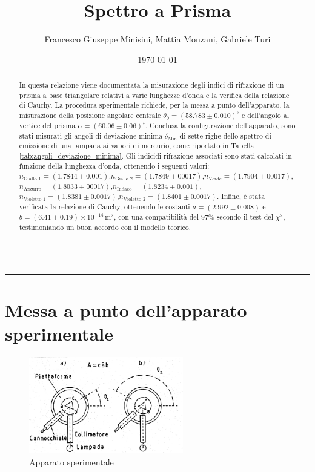 \documentclass[a4paper,12pt]{article}
\title{Spettro a Prisma}
\author{Francesco Giuseppe Minisini, Mattia Monzani, Gabriele Turi}
\date{\today}
\begin{document}
\maketitle
\hrule
\vspace{9pt}
\begin{abstract}
\noindent
In questa relazione viene documentata la misurazione degli indici di rifrazione di un prisma a base triangolare relativi a varie lunghezze d'onda e la verifica della relazione di Cauchy. La procedura sperimentale richiede, per la messa a punto dell'apparato, la misurazione della posizione angolare centrale \(\theta_0 = (58.783 \pm 0.010)^\circ\) e dell'angolo al vertice del prisma \(\alpha = (60.06 \pm 0.06)^\circ\). Conclusa la configurazione dell'apparato, sono stati misurati gli angoli di deviazione minima \(\delta_{\text{Min}}\) di sette righe dello spettro di emissione di una lampada ai vapori di mercurio, come riportato in Tabella \ref{tab:angoli_deviazione_minima}. Gli indicidi rifrazione associati sono stati calcolati in funzione della lunghezza d'onda, ottenendo i seguenti valori: \(n_{\text{Giallo 1}} = (1.7844 \pm 0.001)\),\(n_{\text{Giallo 2}} = (1.7849 \pm 00017)\),\(n_{\text{Verde}} = (1.7904 \pm 00017)\),\(n_{\text{Azzurro}} = (1.8033 \pm 00017)\),\(n_{\text{Indaco}} = (1.8234 \pm 0.001)\),\(n_{\text{Violetto 1}} = (1.8381 \pm 0.0017)\),\(n_{\text{Violetto 2}} = (1.8401 \pm 0.0017)\).
Infine, è stata verificata la relazione di Cauchy, ottenendo le costanti \(a = (2.992 \pm 0.008)\) e \(b = (6.41 \pm 0.19) \times 10^{-14} \, \text{m}^2\), con una compatibilità del \(97\%\) secondo il test del \(\chi^2\), testimoniando un buon accordo con il modello teorico.
\vspace{20pt}
\hrule
\end{abstract}
\vspace{2 pt}

\section{Messa a punto dell'apparato sperimentale}

\begin{figure}[H]
    \centering
    \includegraphics[width=0.6\textwidth]{apparato.png}
    \caption{Apparato sperimentale}
    \label{fig:camera_millikan}
\end{figure}
\end{document}

